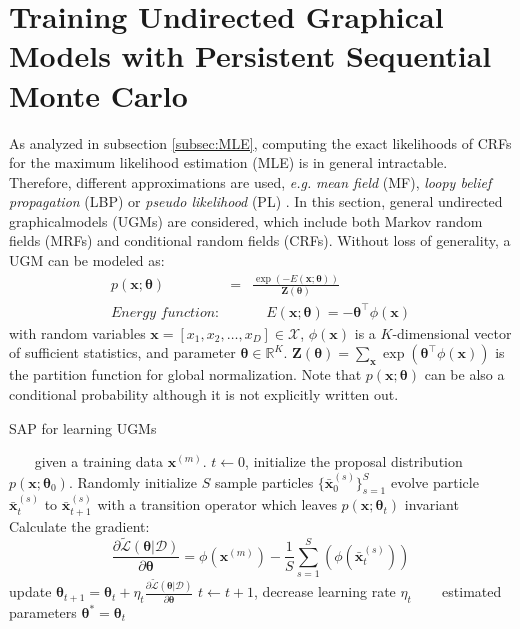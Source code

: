 \section{Training Undirected Graphical Models with Persistent Sequential Monte Carlo}
\label{sec:PSMC}
As analyzed in subsection \ref{subsec:MLE}, computing the exact likelihoods of CRFs for the maximum likelihood estimation (MLE) is in general intractable. 
Therefore, different approximations are used, \emph{e.g.} \emph{mean field} (MF), \emph{loopy 
belief propagation} (LBP) or \emph{pseudo likelihood} (PL) \citep{LBP, Kumar03,CRF,Accelerated_CRF}.  
In this section, general undirected graphicalmodels (UGMs) are considered, which include 
both Markov random fields (MRFs) and conditional random fields (CRFs). 
Without loss of generality, a UGM can be modeled as: 
\begin{eqnarray}
    p(\mathbf{x};\boldsymbol{\theta})&=&\frac{\exp\left(-E(\mathbf{x};\boldsymbol{\theta})\right)}{\mathbf{Z}(\boldsymbol{\theta})}
    \label{equ:MRF}\\
    \textit{Energy function:} & &\quad E(\mathbf{x};\boldsymbol{\theta})=-\boldsymbol{\theta}^\top \phi(\mathbf{x})
    \label{equ:energy}
\end{eqnarray}
with random variables $\mathbf{x}=[x_1,x_2,\dots,x_D]\in\mathcal{X}$, $\phi(\mathbf{x})$ is a $K$-dimensional vector of sufficient statistics, and parameter 
$\boldsymbol{\theta}\in \mathbb{R}^K$. $\mathbf{Z}(\boldsymbol{\theta})=\sum_{\mathbf{x}} \exp (\boldsymbol{\theta}^\top\phi(\mathbf{x}))$ is the partition function for global normalization. 
Note that $p(\mathbf{x};\boldsymbol{\theta})$ can be also a conditional probability although it is not explicitly written out. 
\begin{algorithm} [!t]                    
\caption{SAP for learning UGMs}          
\label{alg:SAP}                           
\begin{algorithmic}[1]
\REQUIRE ~~\ %
given a training data $\mathbf{x}^{(m)}$.  
\STATE  $t\gets 0$, initialize the proposal distribution $p(\mathbf{x};\boldsymbol{\theta}_0)$. 
\STATE  Randomly initialize $S$ sample particles $\{\bar{\mathbf{x}}_0^{(s)}\}_{s=1}^S$
\STATE evolve particle $\bar{\mathbf{x}}_t^{(s)}$ to $\bar{\mathbf{x}}_{t+1}^{(s)}$ with a transition operator which leaves $p(\mathbf{x};\boldsymbol{\theta}_t)$ invariant
\ENDFOR
\STATE Calculate the gradient:
\begin{equation*}
	\frac{\partial \tilde{\mathcal{L}}(\boldsymbol{\theta}|\mathcal{D})}{\partial \boldsymbol{\theta} }=\phi(\mathbf{x}^{(m)})-\frac{1}{S}\sum_{s=1}^S(\phi(\bar{\mathbf{x}}_t^{(s)}))
\end{equation*}
\STATE update $\boldsymbol{\theta}_{t+1}=\boldsymbol{\theta}_{t}+\eta_t \frac{\partial \tilde{\mathcal{L}}(\boldsymbol{\theta}|\mathcal{D})}{\partial \boldsymbol{\theta} }$
\STATE $t \gets t+1$, decrease learning rate $\eta_t$
\ENDWHILE
\ENSURE ~~\ %
estimated parameters  $\boldsymbol{\theta}^*=\boldsymbol{\theta}_t$  
\end{algorithmic}
\end{algorithm}



